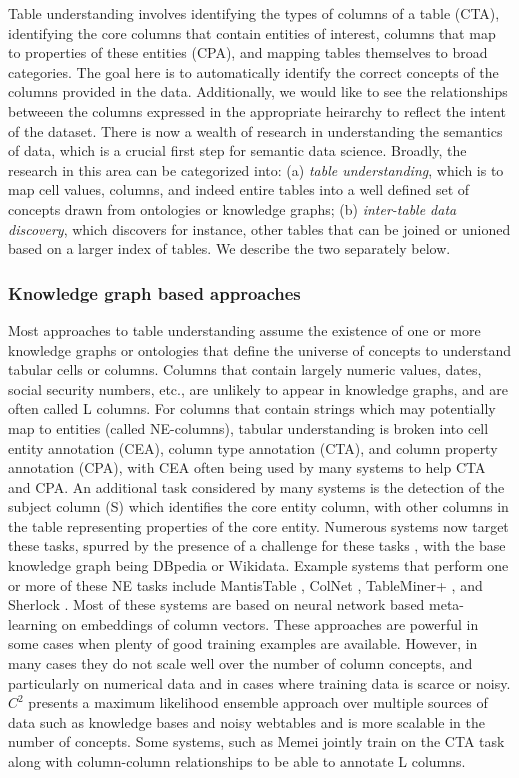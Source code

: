 \documentclass[sigconf]{acmart}
\begin{document}
Table understanding involves identifying the types of columns of a table (CTA), identifying the core columns that contain entities of interest, columns that map to properties of these entities (CPA), and mapping tables themselves to broad categories. The goal here is to automatically identify the correct concepts of the columns provided in the data. Additionally, we would like to see the relationships betweeen the columns expressed in the appropriate heirarchy to reflect the intent of the dataset.
There is now a wealth of research in understanding the semantics of data, which is a crucial first step for semantic data science.  Broadly, the research in this area can be categorized into: (a) {\em table understanding}, which is to map cell values, columns, and indeed entire tables into a well defined set of concepts drawn from ontologies or knowledge graphs; (b) {\em inter-table data discovery}, which discovers for instance, other tables that can be joined or unioned based on a larger index of tables.  We describe the two separately below.

\subsubsection{Knowledge graph based approaches}
Most approaches to table understanding assume the existence of one or more knowledge graphs or ontologies that define the universe of concepts to understand tabular cells or columns.  Columns that contain largely numeric values, dates, social security numbers, etc., are unlikely to appear in knowledge graphs, and are often called L columns.  For columns that contain strings which may potentially map to entities (called NE-columns), tabular understanding is broken into cell entity annotation (CEA), column type annotation (CTA), and column property annotation (CPA), with CEA often being used by many systems to help CTA and CPA.  An additional task considered by many systems is the detection of the subject column (S) which identifies the core entity column, with other columns in the table representing properties of the core entity.  Numerous systems now target these tasks, spurred by the presence of a challenge for these tasks \cite{semtab2019}, with the base knowledge graph being DBpedia or Wikidata.  Example systems that perform one or more of these NE tasks include MantisTable \cite{DBLP:journals/fgcs/CremaschiPRS20}, ColNet \cite{city22932}, TableMiner+ \cite{10.1007/978-3-319-18818-8_25}, and Sherlock \cite{10.1145/3292500.3330993}. Most of these systems are based on neural network based meta-learning on embeddings of column vectors. These approaches are powerful in some cases when plenty of good training examples are available. However, in many cases they do not scale well over the number of column concepts, and particularly on numerical data and in cases where training data is scarce or noisy. $C^2$\cite{khurana2020semantic} presents a maximum likelihood ensemble approach over multiple sources of data such as knowledge bases and noisy webtables and is more scalable in the number of concepts. Some systems, such as Memei \cite{Takeoka_Oyamada_Nakadai_Okadome_2019} jointly train on the CTA task along with column-column relationships to be able to annotate L columns.  
\end{document}
